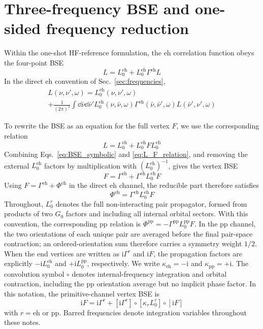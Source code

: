 \documentclass[aip,jcp,reprint,noshowkeys,superscriptaddress]{revtex4-1}
\newcommand{\ii}{\mathrm{i}}
\newcommand{\eh}{\text{eh}}
\newcommand{\pp}{\text{pp}}
\begin{document}
\section{Three-frequency BSE and one-sided frequency reduction}
\label{sec:three_frequency_bse}

Within the one-shot HF-reference formulation, the $\eh$ correlation function obeys the
four-point BSE
\begin{equation}
	L
	=
	L_0^\eh
	+
	L_0^\eh \Gamma^\eh L
	\label{eq:BSE_symbolic}
\end{equation}
In the direct $\eh$ convention of Sec.~\ref{sec:frequencies},
\begin{multline}
	L(\nu,\nu',\omega)
	=
	L_0^\eh(\nu,\nu',\omega)
	\\
	+
	\frac{1}{(2\pi)^2}
	\int \dd{\bar\nu}\dd{\bar\nu'}
	L_0^\eh(\nu,\bar\nu,\omega)
	\Gamma^\eh(\bar\nu,\bar\nu',\omega)
	L(\bar\nu',\nu',\omega)
	\label{eq:BSE_three_frequency}
\end{multline}

To rewrite the BSE as an equation for the full vertex $F$, we use the corresponding relation
\begin{equation}
	L
	=
	L_0^\eh
	+
	L_0^\eh F L_0^\eh
	\label{eq:L_F_relation}
\end{equation}
Combining Eqs.~\eqref{eq:BSE_symbolic} and \eqref{eq:L_F_relation}, 
and removing the external $L_0^\eh$ factors by multiplication with $(L_0^\eh)^{-1}$, gives the vertex BSE
\begin{equation}
	F
	=
	\Gamma^\eh
	+
	\Gamma^\eh L_0^\eh F
	\label{eq:F_BSE_eh}
\end{equation}
Using $F=\Gamma^\eh+\Phi^\eh$ in the direct $\eh$ channel, the reducible
part therefore satisfies
\begin{equation}
	\Phi^\eh
	=
	\Gamma^\eh L_0^\eh F
	\label{eq:Phi_BSE_eh}
\end{equation}
Throughout, $L_0^r$ denotes the full non-interacting pair propagator,
formed from products of two $G_0$ factors and including all
internal orbital sectors. With this convention, the corresponding $\pp$
relation is $\Phi^\pp=-\Gamma^\pp L_0^\pp F$.
In the $\pp$ channel, the two orientations of each unique pair are averaged
before the final pair-space contraction; an ordered-orientation sum therefore
carries a symmetry weight $1/2$. When the end vertices are written as
$\ii\Gamma^r$ and $\ii F$, the propagation factors are explicitly
$-\ii L_0^\eh$ and $+\ii L_0^\pp$, respectively.
We write $\kappa_\eh=-\ii$ and $\kappa_\pp=+\ii$.
The convolution symbol $\circ$ denotes internal-frequency integration
and orbital contraction, including the $\pp$ orientation average but no
implicit phase factor. In this notation, the primitive-channel vertex BSE is
\begin{equation}
    \ii F
    =\ii\Gamma^r
    +[\ii\Gamma^r]\circ[\kappa_r L_0^r]\circ[\ii F]
    \label{eq:F_BSE_channel_phases}
\end{equation}
with $r = \eh$ or $\pp$.
Barred frequencies denote integration variables throughout these notes.
\end{document}
